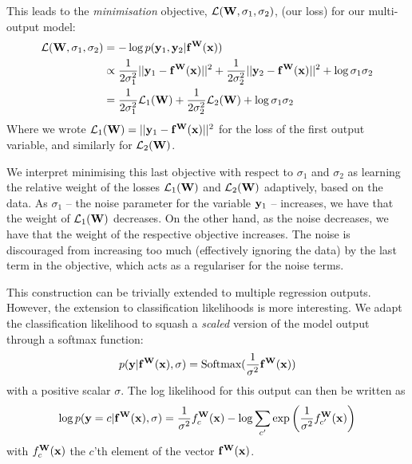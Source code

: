 This leads to the \textit{minimisation} objective, $\mathcal{L}(\mathbf{W}, \sigma_1, \sigma_2)$, (our loss) for our multi-output model:
\begin{equation}
\begin{split}
\mathcal{L}(\mathbf{W}, \sigma_1, \sigma_2) &= 
- \log p(\mathbf{y}_1, \mathbf{y}_2 | \mathbf{f}^{\mathbf{W}}(\mathbf{x})) \\
&\propto
\frac{1}{2 \sigma_1^2} ||\mathbf{y}_1 - \mathbf{f}^{\mathbf{W}}(\mathbf{x})||^2
+ \frac{1}{2 \sigma_2^2} ||\mathbf{y}_2 - \mathbf{f}^{\mathbf{W}}(\mathbf{x})||^2 
+ \log \sigma_1 \sigma_2 \\
&= \frac{1}{2 \sigma_1^2} \mathcal{L}_1(\mathbf{W}) 
+ \frac{1}{2 \sigma_2^2} \mathcal{L}_2(\mathbf{W})
+ \log \sigma_1 \sigma_2
\end{split}
\end{equation}
Where we wrote $\mathcal{L}_1(\mathbf{W}) = ||\mathbf{y}_1 - \mathbf{f}^{\mathbf{W}}(\mathbf{x})||^2$ for the loss of the first output variable, and similarly for $\mathcal{L}_2(\mathbf{W})$.


We interpret minimising this last objective with respect to $\sigma_1$ and $\sigma_2$ as learning the relative weight of the losses $\mathcal{L}_1(\mathbf{W})$ and $\mathcal{L}_2(\mathbf{W})$ adaptively, based on the data. As $\sigma_1$ -- the noise parameter for the variable $\mathbf{y}_1$ -- increases, we have that the weight of $\mathcal{L}_1(\mathbf{W})$ decreases. On the other hand, as the noise decreases, we have that the weight of the respective objective increases. The noise is discouraged from increasing too much (effectively ignoring the data) by the last term in the objective, which acts as a regulariser for the noise terms.

This construction can be trivially extended to multiple regression outputs. However, the extension to classification likelihoods is more interesting. We adapt the classification likelihood to squash a \textit{scaled} version of the model output through a softmax function:
\begin{equation}
p(\mathbf{y} | \mathbf{f}^{\mathbf{W}}(\mathbf{x}), \sigma) = \text{Softmax}( \frac{1}{\sigma^2} \mathbf{f}^{\mathbf{W}}(\mathbf{x}))
\end{equation}
with a positive scalar $\sigma$. The log likelihood for this output can then be written as 
\begin{equation}
\log p(\mathbf{y} = c | \mathbf{f}^{\mathbf{W}}(\mathbf{x}), \sigma) = \frac{1}{\sigma^2} f^{\mathbf{W}}_c(\mathbf{x}) - \log \sum_{c'} \exp \bigg( \frac{1}{\sigma^2} f^{\mathbf{W}}_{c'}(\mathbf{x}) \bigg)
\end{equation}
with $f^{\mathbf{W}}_c(\mathbf{x})$ the $c$'th element of the vector $\mathbf{f}^{\mathbf{W}}(\mathbf{x})$.

